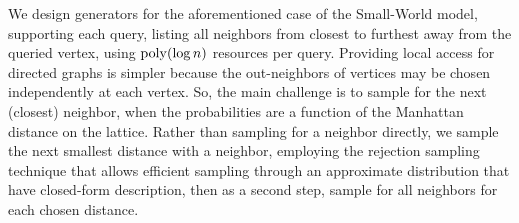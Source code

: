 We design generators for the aforementioned case of the Small-World model, supporting each  query,
listing all neighbors from closest to furthest away from the queried vertex, using $\mathrm{poly}(\log n)$ resources per query.
Providing local access for directed graphs is simpler because the out-neighbors of vertices may be chosen independently at each vertex.
So, the main challenge is to sample for the next (closest) neighbor, when the probabilities are a function of the Manhattan distance on the lattice.
Rather than sampling for a neighbor directly, we sample the next smallest distance with a neighbor,
employing the rejection sampling technique that allows efficient sampling through an approximate distribution that have closed-form description,
then as a second step, sample for all neighbors for each chosen distance.
